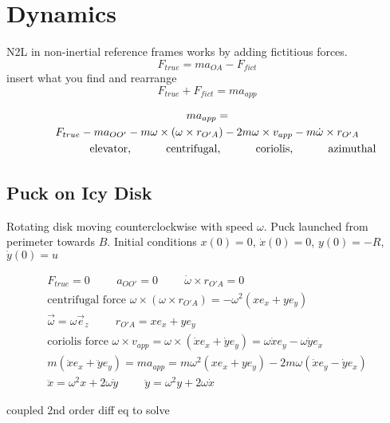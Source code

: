 \documentclass[fleqn]{report}
\newcommand{\hp}{\hspace{1cm}}
\newcommand{\equations} [1] {
\begin{gather*}
#1
\end{gather*}
}
\begin{document}
\section{Dynamics}
N2L in non-inertial reference frames works by adding fictitious forces. 
\[
F_{true} = m a_{O A} - F_{fict}
\]
insert what you find and rearrange 
\[
F_{true} + F_{fict} = m a_{app}
\]


\equations{
    m a_{app} = 
    \\
    F_{true} - m a_{O O'} - m \omega \times (\omega \times r_{O' A})
    - 2 m \omega \times v_{app} - m \dot \omega \times r_{O' A}
    \\
    \textrm{\hspace{1.5cm} elevator, \hp centrifugal, \hp coriolis, \hp azimuthal}
}

\subsection{Puck on Icy Disk}
Rotating disk moving counterclockwise with speed $\omega$. Puck launched from perimeter towards $B$. 
Initial conditions $x(0) = 0$, $\dot x(0) = 0$, $y(0) = -R$, $\dot y(0) = u$

\equations{
    F_{true} = 0
    \hp 
    a_{O O'} = 0
    \hp 
    \dot \omega \times r_{O' A} = 0
    \\
    \textrm{centrifugal force } \omega \times (\omega \times r_{O' A})
    = -\omega^2 (x e_x + y e_y)
    \\
    \vec \omega = \omega \vec e_{z}
    \hp 
    r_{O' A} = x e_x + y e_y
    \\
    \textrm{coriolis force } \omega \times v_{app} = 
    \omega \times (\dot x e_x + \dot y e_y)
    =
    \omega \dot x e_y - \omega \dot y e_x
    \\
    m (\ddot x e_x + \ddot y e_y) = 
    m a_{app} = m \omega^2 (x e_x + y e_y) - 
    2 m \omega (\dot x e_y - \dot y e_x)
    \\
    \ddot x = \omega^2 x + 2 \omega \dot y 
    \hp
    \ddot y = \omega^2 y + 2 \omega \dot x
}
coupled 2nd order diff eq to solve 
\end{document}
